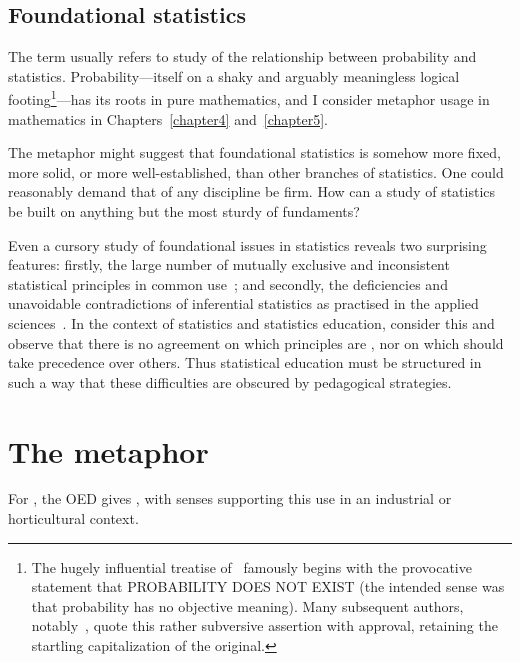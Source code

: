 \subsection{Foundational statistics}

The term  usually refers to study of
the relationship between probability and statistics.
Probability---itself on a shaky and arguably meaningless logical
footing\footnote{The hugely influential treatise
  of~ famously begins with the provocative
  statement that PROBABILITY DOES NOT EXIST (the intended sense was
  that probability has no objective meaning).  Many subsequent
  authors, notably~, quote this rather subversive
  assertion with approval, retaining the startling capitalization of
  the original.}---has its roots in pure mathematics, and I consider
metaphor usage in mathematics in Chapters~\ref{chapter4}
and~\ref{chapter5}.

The  metaphor might suggest that foundational
statistics is somehow more fixed, more solid, or more
well-established, than other branches of statistics.  One could
reasonably demand that  of any discipline be firm.
How can a study of statistics be built on anything but the most sturdy
of fundaments?

Even a cursory study of foundational issues in statistics reveals two
surprising features: firstly, the large number of mutually exclusive
and inconsistent statistical principles in common
use~\parencite{edwards1984}; and secondly, the deficiencies and
unavoidable contradictions of inferential statistics as practised in
the applied sciences~\parencite{wasserstein2016}.  In the context of
statistics and statistics education,  consider this
and observe that there is no agreement on which principles are
, nor on which should take precedence over others.  Thus
statistical education must be structured in such a way that these
difficulties are obscured by pedagogical strategies.

\section{The  metaphor}

For , the OED gives , with senses supporting this use in an
industrial or horticultural context.

